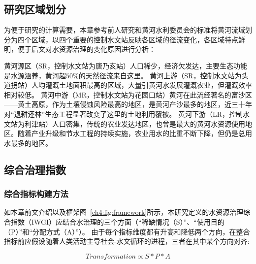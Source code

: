 \subsection{研究区域划分}\label{ch4:sec:region}

为便于研究的计算需要，本章参考前人研究和黄河水利委员会的标准将黄河流域划分为四个区域\cite{shuilibuhuangheshuiliweiyuanhui,wang2019c,wang2016e}，以四个重要的控制水文站反映各区域的径流变化，各区域特点鲜明，便于后文对水资源治理的变化原因进行分析：

黄河源区（SR，控制水文站为唐乃亥站）人口稀少，经济欠发达，主要生态功能是水源涵养，黄河超$50\%$的天然径流来自这里。
黄河上游（SR，控制水文站为头道拐站）人均灌溉土地面积最高的区域，大量引黄河水发展灌溉农业，但灌溉效率相对较低。
黄河中游（MR，控制水文站为花园口站）黄河在此流经著名的富沙区——黄土高原，作为土壤侵蚀风险最高的地区，是黄河产沙最多的地区，近三十年对“退耕还林”生态工程显著改变了这里的土地利用覆被。
黄河下游（LR，控制水文站为利津站）人口密集，传统的农业发达地区，也曾是最大的黄河水资源使用地区。随着产业升级和节水工程的持续实施，农业用水的比重不断下降，但仍是总用水最多的地区。



\subsection{综合治理指数}

\subsubsection{综合指标构建方法}

如本章前文介绍以及框架图~\ref{ch4:fig:framework}所示，本研究定义的水资源治理综合指数（IWGI）应结合水治理的三个方面（“稀缺情况（S）”、“使用目的（P）”和“分配方式（A）”）。
由于每个指标维度都有升高和降低两个方向，在整合指标前应假设随着人类活动主导社会-水文循环的进程，三者在其中某个方向对齐:

\begin{equation}
    Transformation \propto S*P*A
\end{equation}

